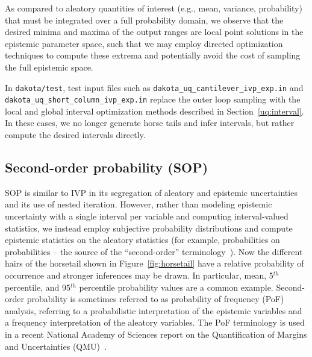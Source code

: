 As compared to aleatory quantities of interest (e.g., mean, variance,
probability) that must be integrated over a full probability domain,
we observe that the desired minima and maxima of the output ranges are
local point solutions in the epistemic parameter space, such that we
may employ directed optimization techniques to compute these extrema
and potentially avoid the cost of sampling the full epistemic space.

In \texttt{dakota/test}, test input files such as
\texttt{dakota\_uq\_cantilever\_ivp\_exp.in} and\\
\texttt{dakota\_uq\_short\_column\_ivp\_exp.in} replace the outer loop
sampling with the local and global interval optimization methods
described in Section~\ref{uq:interval}. In these cases, we no longer
generate horse tails and infer intervals, but rather compute the
desired intervals directly.


\subsection{Second-order probability (SOP)} \label{adv_models:mixed_uq:sop}

SOP is similar to IVP in its segregation of aleatory and epistemic
uncertainties and its use of nested iteration. However, rather than
modeling epistemic uncertainty with a single interval per variable and
computing interval-valued statistics, we instead employ subjective
probability distributions and compute epistemic statistics on the
aleatory statistics (for example, probabilities on probabilities --
the source of the ``second-order'' terminology~\cite{GoNg99}). Now
the different hairs of the horsetail shown in
Figure~\ref{fig:horsetail} have a relative probability of occurrence
and stronger inferences may be drawn. In particular, mean, 5$^{th}$
percentile, and 95$^{th}$ percentile probability values are a common
example. Second-order probability is sometimes referred to as
probability of frequency (PoF) analysis, referring to a probabilistic
interpretation of the epistemic variables and a frequency
interpretation of the aleatory variables. The PoF terminology is used
in a recent National Academy of Sciences report on the Quantification
of Margins and Uncertainties (QMU)~\cite{NAS08}.


